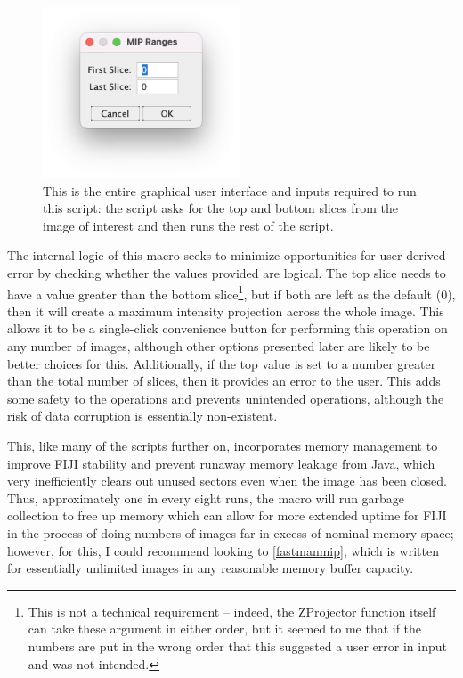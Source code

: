 \begin{figure}
\centering
\includegraphics[height=2in]{images/mipgui.png}
\caption{This is the entire graphical user interface and inputs required to run this script: the script asks for the top and bottom slices from the image of interest and then runs the rest of the script.}
\label{figure:mipgui}
\end{figure}

The internal logic of this macro seeks to minimize opportunities for user\hyp{}derived error by checking whether the values provided are logical. The top slice needs to have a value greater than the bottom slice\footnote{This is not a technical requirement -- indeed, the ZProjector function itself can take these argument in either order, but it seemed to me that if the numbers are put in the wrong order that this suggested a user error in input and was not intended.}, but if both are left as the default (0), then it will create a maximum intensity projection across the whole image. This allows it to be a single\hyp{}click convenience button for performing this operation on any number of images, although other options presented later are likely to be better choices for this. Additionally, if the top value is set to a number greater than the total number of slices, then it provides an error to the user. This adds some safety to the operations and prevents unintended operations, although the risk of data corruption is essentially non\hyp{}existent. 

This, like many of the scripts further on, incorporates memory management to improve FIJI stability and prevent runaway memory leakage from Java, which very inefficiently clears out unused sectors even when the image has been closed. Thus, approximately one in every eight runs, the macro will run garbage collection to free up memory which can allow for more extended uptime for FIJI in the process of doing numbers of images far in excess of nominal memory space; however, for this, I could recommend looking to \autoref{fastmanmip}, which is written for essentially unlimited images in any reasonable memory buffer capacity.

